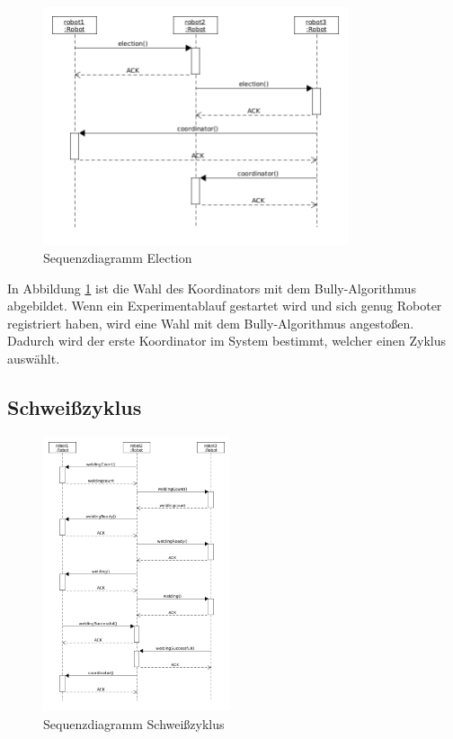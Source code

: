 \begin{figure}[h]
 \begin{center}
 \includegraphics[width=0.8\textwidth]{../diagrams/9_sequence_election.png}
 \end{center}
 \caption{Sequenzdiagramm Election}
 \label{fig:seq_election}
\end{figure}

In Abbildung \ref{fig:seq_election} ist die Wahl des Koordinators mit dem Bully-Algorithmus abgebildet.
Wenn ein Experimentablauf gestartet wird und sich genug Roboter registriert haben, wird eine Wahl mit dem
Bully-Algorithmus angestoßen. Dadurch wird der erste Koordinator im System bestimmt, welcher einen Zyklus
auswählt.

\clearpage

\subsection{Schweißzyklus}

\begin{figure}[h]
 \begin{center}
 \includegraphics[width=0.49\textwidth]{../diagrams/10_sequence_welding.png}
 \end{center}
 \caption{Sequenzdiagramm Schweißzyklus}
 \label{fig:seq_welding}
\end{figure}


